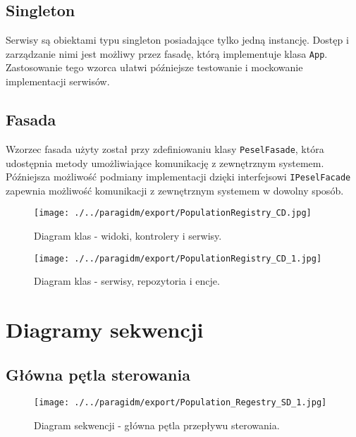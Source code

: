 \documentclass[12pt]{article}
\begin{document}
\subsection{Singleton}
Serwisy są obiektami typu singleton posiadające tylko jedną instancję. Dostęp i zarządzanie nimi jest możliwy przez fasadę, którą implementuje klasa \lstinline{App}.
Zastosowanie tego wzorca ułatwi późniejsze testowanie i mockowanie implementacji serwisów. 
\subsection{Fasada}
Wzorzec fasada użyty został przy zdefiniowaniu klasy \lstinline{PeselFasade}, która udostępnia metody umożliwiające komunikację z zewnętrznym systemem. Późniejsza możliwość podmiany implementacji dzięki interfejsowi \lstinline{IPeselFacade} zapewnia możliwość komunikacji z zewnętrznym systemem w dowolny sposób.


\begin{sidewaysfigure}[h]
    \centering
    \texttt{[image: ./../paragidm/export/PopulationRegistry\_CD.jpg]}
    \caption{Diagram klas - widoki, kontrolery i serwisy.}
    \label{}
\end{sidewaysfigure}

\begin{sidewaysfigure}[H]
    \centering
    \texttt{[image: ./../paragidm/export/PopulationRegistry\_CD\_1.jpg]}
    \caption{Diagram klas - serwisy, repozytoria i encje.}
    \label{}
\end{sidewaysfigure}
\clearpage

\section{Diagramy sekwencji}
\subsection{Główna pętla sterowania}
\begin{figure}[H]
    \centering
    \texttt{[image: ./../paragidm/export/Population\_Regestry\_SD\_1.jpg]}
    \caption{Diagram sekwencji - główna pętla przepływu sterowania.}
    \label{}
\end{figure}
\end{document}
